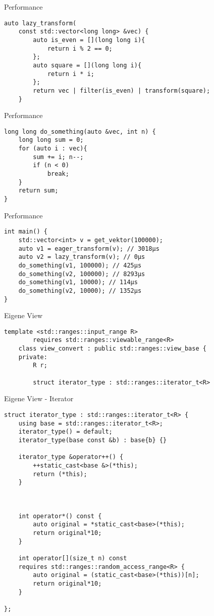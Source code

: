 \begin{frame}[fragile]{Performance}
    \begin{verbatim}
auto lazy_transform(
    const std::vector<long long> &vec) {
        auto is_even = [](long long i){
            return i % 2 == 0;
        };
        auto square = [](long long i){
            return i * i;
        };
        return vec | filter(is_even) | transform(square);
    }
    \end{verbatim}
\end{frame}

\begin{frame}[fragile]{Performance}
    \begin{verbatim}
long long do_something(auto &vec, int n) {
    long long sum = 0;
    for (auto i : vec){
        sum += i; n--;
        if (n < 0)
            break;
    }
    return sum;
}
    \end{verbatim}
\end{frame}

\begin{frame}[fragile]{Performance}
    \begin{verbatim}
int main() {
    std::vector<int> v = get_vektor(100000);
    auto v1 = eager_transform(v); // 3018µs
    auto v2 = lazy_transform(v); // 0µs
    do_something(v1, 100000); // 425µs
    do_something(v2, 100000); // 8293µs
    do_something(v1, 10000); // 114µs
    do_something(v2, 10000); // 1352µs
}
    \end{verbatim}
\end{frame}

\begin{frame}[fragile]{Eigene View}
    \begin{verbatim}
template <std::ranges::input_range R>
        requires std::ranges::viewable_range<R>
    class view_convert : public std::ranges::view_base {
    private:
        R r;
    
        struct iterator_type : std::ranges::iterator_t<R>
    \end{verbatim}
\end{frame}

\begin{frame}{Eigene View - Iterator}
    \begin{verbatim}
struct iterator_type : std::ranges::iterator_t<R> {
    using base = std::ranges::iterator_t<R>;
    iterator_type() = default;
    iterator_type(base const &b) : base{b} {}

    iterator_type &operator++() {
        ++static_cast<base &>(*this);
        return (*this);
    }



    int operator*() const {
        auto original = *static_cast<base>(*this);
        return original*10;
    }

    int operator[](size_t n) const
    requires std::ranges::random_access_range<R> {
        auto original = (static_cast<base>(*this))[n];
        return original*10;
    }

};
    \end{verbatim}
\end{frame}

